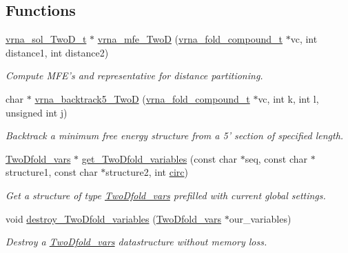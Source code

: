 \subsection*{Functions}
\begin{DoxyCompactItemize}
\item 
\hyperlink{group__kl__neighborhood__mfe_structvrna__sol__TwoD__t}{vrna\+\_\+sol\+\_\+\+Two\+D\+\_\+t} $\ast$ \hyperlink{group__kl__neighborhood__mfe_ga243c288b463147352829df04de6a2f77}{vrna\+\_\+mfe\+\_\+\+Two\+D} (\hyperlink{group__fold__compound_ga1b0cef17fd40466cef5968eaeeff6166}{vrna\+\_\+fold\+\_\+compound\+\_\+t} $\ast$vc, int distance1, int distance2)
\begin{DoxyCompactList}\small\item\em Compute M\+F\+E's and representative for distance partitioning. \end{DoxyCompactList}\item 
char $\ast$ \hyperlink{group__kl__neighborhood__mfe_ga15a96fc96f4f4c2e01a11b3e17d1ef43}{vrna\+\_\+backtrack5\+\_\+\+Two\+D} (\hyperlink{group__fold__compound_ga1b0cef17fd40466cef5968eaeeff6166}{vrna\+\_\+fold\+\_\+compound\+\_\+t} $\ast$vc, int k, int l, unsigned int j)
\begin{DoxyCompactList}\small\item\em Backtrack a minimum free energy structure from a 5' section of specified length. \end{DoxyCompactList}\item 
\hyperlink{group__kl__neighborhood__mfe_structTwoDfold__vars}{Two\+Dfold\+\_\+vars} $\ast$ \hyperlink{group__kl__neighborhood__mfe_gac9284f132cf0eaa0a2f43590eda05488}{get\+\_\+\+Two\+Dfold\+\_\+variables} (const char $\ast$seq, const char $\ast$structure1, const char $\ast$structure2, int \hyperlink{group__model__details_gaf9202a1a09f5828dc731e2d9a10fa111}{circ})
\begin{DoxyCompactList}\small\item\em Get a structure of type \hyperlink{group__kl__neighborhood__mfe_structTwoDfold__vars}{Two\+Dfold\+\_\+vars} prefilled with current global settings. \end{DoxyCompactList}\item 
void \hyperlink{group__kl__neighborhood__mfe_ga05bf4f31d216b1b160fd2d3d68e9b487}{destroy\+\_\+\+Two\+Dfold\+\_\+variables} (\hyperlink{group__kl__neighborhood__mfe_structTwoDfold__vars}{Two\+Dfold\+\_\+vars} $\ast$our\+\_\+variables)
\begin{DoxyCompactList}\small\item\em Destroy a \hyperlink{group__kl__neighborhood__mfe_structTwoDfold__vars}{Two\+Dfold\+\_\+vars} datastructure without memory loss. \end{DoxyCompactList}\item 

\end{DoxyCompactItemize}
